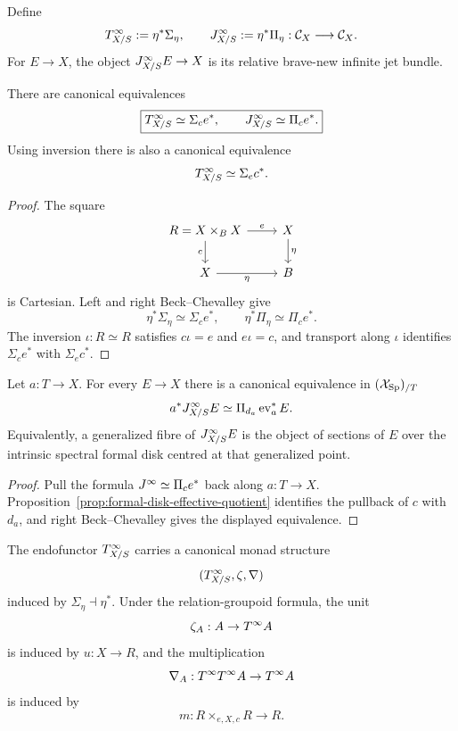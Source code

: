 \begin{definition}
\label{def:formal-disk-jet-functors}
Define
\[
    T^{\infty}_{X/S}:=\eta^*\Sigma_\eta,
    \qquad
    J^{\infty}_{X/S}:=\eta^*\Pi_\eta
    :\mathcal C_X\longrightarrow\mathcal C_X.
\]
For $E\to X$, the object $J^{\infty}_{X/S}E\to X$ is its relative brave-new infinite jet bundle.
\end{definition}

\begin{proposition}
\label{prop:Tinf-relation-formula}
\label{prop:jet-relation-formula}
There are canonical equivalences
\[
    \boxed{
    T^{\infty}_{X/S}\simeq\Sigma_ce^*,
    \qquad
    J^{\infty}_{X/S}\simeq\Pi_ce^*.
    }
\]
Using inversion there is also a canonical equivalence
\[
    T^{\infty}_{X/S}\simeq\Sigma_ec^*.
\]
\end{proposition}

\begin{proof}
The square
\[
\begin{tikzcd}
R=X\times_BX
  \arrow[r,"e"]
  \arrow[d,"c"']
& X \arrow[d,"\eta"]
\\
X \arrow[r,"\eta"'] & B
\end{tikzcd}
\]
is Cartesian.  Left and right Beck--Chevalley give
\[
    \eta^*\Sigma_\eta\simeq\Sigma_ce^*,
    \qquad
    \eta^*\Pi_\eta\simeq\Pi_ce^*.
\]
The inversion $\iota:R\simeq R$ satisfies $c\iota=e$ and $e\iota=c$, and transport along $\iota$ identifies $\Sigma_ce^*$ with $\Sigma_ec^*$.
\end{proof}

\begin{theorem}
\label{thm:jet-fibre-formula}
Let $a:T\to X$.  For every $E\to X$ there is a canonical equivalence in $(\mathcal{X}_{\mathrm{Sp}})_{/T}$
\[
    a^*J^{\infty}_{X/S}E
    \simeq
    \Pi_{d_a}\operatorname{ev}_a^*E.
\]
Equivalently, a generalized fibre of $J^{\infty}_{X/S}E$ is the object of sections of $E$ over the intrinsic spectral formal disk centred at that generalized point.
\end{theorem}

\begin{proof}
Pull the formula $J^{\infty}\simeq\Pi_ce^*$ back along $a:T\to X$.  Proposition~\ref{prop:formal-disk-effective-quotient} identifies the pullback of $c$ with $d_a$, and right Beck--Chevalley gives the displayed equivalence.
\end{proof}

\begin{proposition}
\label{prop:formal-disk-monad}
The endofunctor $T^{\infty}_{X/S}$ carries a canonical monad structure
\[
    (T^{\infty}_{X/S},\zeta,\nabla)
\]
induced by $\Sigma_\eta\dashv\eta^*$.  Under the relation-groupoid formula, the unit
\[
    \zeta_A:A\to T^{\infty} A
\]
is induced by $u:X\to R$, and the multiplication
\[
    \nabla_A:T^{\infty}T^{\infty} A\to T^{\infty} A
\]
is induced by
\[
    m:R\times_{e,X,c}R\to R.
\]
\end{proposition}

